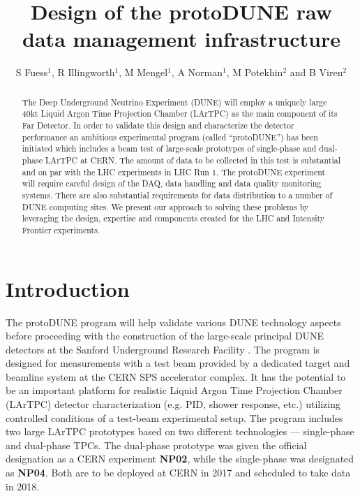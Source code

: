 \documentclass[a4paper]{jpconf}
\newcommand{\pd}{protoDUNE\xspace}
\begin{document}
\title{Design of the \pd raw data management infrastructure}

\author{S Fuess$^1$, R Illingworth$^1$, M Mengel$^1$, A Norman$^1$, M Potekhin$^2$ and B Viren$^2$}

\address{$^1$ Fermi National Accelerator Laboratory, Batavia, IL 60510, USA}
\address{$^2$ Brookhaven National Laboratory, Upton, NY 11973, USA}


\begin{abstract}
The Deep Underground Neutrino Experiment (DUNE) will employ a uniquely large 40kt Liquid Argon
Time Projection Chamber (LArTPC) as the main component of its Far Detector.
In order to validate this design and characterize the detector performance an
ambitious experimental program (called ``\pd'') has been
initiated which includes a beam test of large-scale prototypes of single-phase and dual-phase LArTPC
at CERN. The amount of data to be collected in this test is substantial and on par with the LHC experiments
in LHC Run 1. The protoDUNE experiment will require careful design of the DAQ, data handling and
data quality monitoring systems. There are also substantial requirements for data distribution
to a number of DUNE computing sites. We present our approach to solving these problems by
leveraging the design, expertise and components created for the LHC and Intensity Frontier
experiments. 
\end{abstract}

\section{Introduction}
The \pd program will help validate various DUNE technology aspects before proceeding with
the construction of the large-scale principal DUNE detectors at the Sanford Underground Research Facility \cite{cdrVol1, cdrVol4}.
The program is designed for measurements with a test beam provided by a dedicated target and beamline system
at the CERN SPS accelerator complex. It has the potential to be an important platform for realistic
Liquid Argon Time Projection Chamber (LArTPC) detector characterization (e.g. PID, shower response, etc.)
utilizing controlled conditions of a test-beam experimental setup. The program includes two
large LArTPC prototypes based on two different technologies --- single-phase and dual-phase TPCs.
The dual-phase prototype was given the official designation as a CERN experiment \textbf{NP02},
while the single-phase was designated as \textbf{NP04}. Both are to be deployed at CERN in 2017
and scheduled to take data in 2018.
\end{document}
